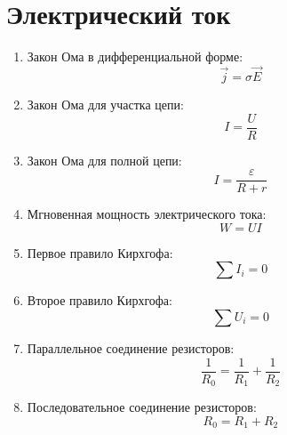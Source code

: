 	\section{Электрический ток}
	\begin{enumerate}
		\item Закон Ома в дифференциальной форме: \[ \overrightarrow{j} = \sigma \overrightarrow{E} \]
		\item Закон Ома для участка цепи: \[ I = \frac{U}{R} \]
		\item Закон Ома для полной цепи: \[ I = \frac{\varepsilon}{R + r} \]
		\item Мгновенная мощность электрического тока: \[ W = UI \]
		\item Первое правило Кирхгофа: \[ \sum I_i = 0 \]
		\item Второе правило Кирхгофа: \[ \sum U_i = 0 \]
		\item Параллельное соединение резисторов: \[ \frac{1}{R_0} = \frac{1}{R_1} + \frac{1}{R_2} \]
		\item Последовательное соединение резисторов: \[ R_0 = R_1 + R_2 \]
	\end{enumerate}
	
